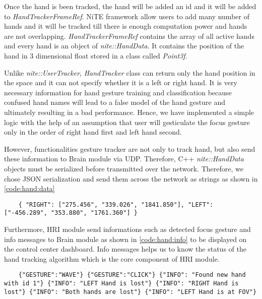 Once the hand is been tracked, the hand will be added an id and it will be added to \textit{HandTrackerFrameRef}. NiTE framework allow users to add many number of hands and it will be tracked till there is enough computation power and hands are not overlapping. \textit{HandTrackerFrameRef} contains the array of all active hands and every hand is an object of \textit{nite::HandData}. It contains the position of the hand in 3 dimensional float stored in a class called \textit{Point3f}.

Unlike \textit{nite::UserTracker}, \textit{HandTracker} class can return only the hand position in the space and it can not specify whether it is a left or right hand. It is very necessary information for hand gesture training and classification because confused hand names will lead to a false model of the hand gesture and ultimately resulting in a bad performance. Hence, we have implemented a simple logic with the help of an assumption that user will gesticulate the focus gesture only in the order of right hand first and left hand second. 

However, functionalities gesture tracker are not only to track hand, but also send these information to Brain module via UDP. Therefore, C++ \textit{nite::HandData} objects must be serialized before transmitted over the network. Therefore, we chose JSON serialization and send them across the network as strings as shown in \ref{code:hand:data} 
\begin{lstlisting}
	{ "RIGHT": ["275.456", "339.026", "1841.850"], "LEFT": ["-456.289", "353.880", "1761.360"] } 
\end{lstlisting}
\label{code:hand:data}

Furthermore, HRI module send informations such as detected focus gesture and info messages to Brain module as shown in \ref{code:hand:info} to be displayed on the control center dashboard. Info messages helps us to know the status of the hand tracking algorithm which is the core component of HRI module. 
\begin{lstlisting}
	{"GESTURE":"WAVE"} {"GESTURE":"CLICK"} {"INFO": "Found new hand with id 1"} {"INFO": "LEFT Hand is lost"} {"INFO": "RIGHT Hand is lost"} {"INFO": "Both hands are lost"} {"INFO": "LEFT Hand is at FOV"} 
\end{lstlisting}
\label{code:hand:info}

